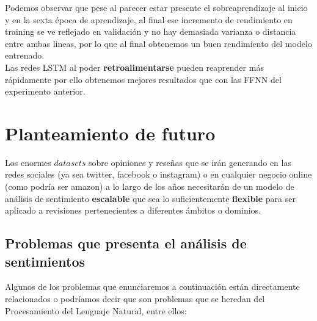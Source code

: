 \documentclass[a4paper,12pt]{report}
\begin{document}
\vspace{4mm}
Podemos observar que pese al parecer estar presente el sobreaprendizaje al inicio y en la sexta época de aprendizaje, al final ese incremento de rendimiento en training se ve reflejado en validación y no hay demasiada varianza o distancia entre ambas lineas, por lo que al final obtenemos un buen rendimiento del modelo entrenado.
\vspace{2mm}\\
Las redes LSTM al poder \textbf{retroalimentarse} pueden reaprender más rápidamente por ello obtenemos mejores resultados que con las FFNN del experimento anterior.


\chapter{Planteamiento de futuro}

Los enormes $datasets$ sobre opiniones y reseñas que se irán generando en las redes sociales (ya sea twitter, facebook o instagram) o en cualquier negocio online (como podría ser amazon) a lo largo de los años necesitarán de un
modelo de análisis de sentimiento \textbf{escalable} que sea lo suficientemente \textbf{flexible}
para ser aplicado a revisiones pertenecientes a diferentes ámbitos o dominios.

\section{Problemas que presenta el análisis de sentimientos}

{\setlength{\parindent}{0cm}
Algunos de los problemas que enunciaremos a continuación están directamente relacionados o podríamos decir que son problemas que se heredan del Procesamiento del Lenguaje Natural, entre ellos:}
\end{document}
